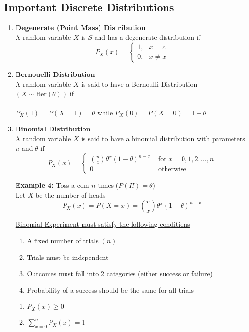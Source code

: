 \documentclass[12pt, twoside]{article}
\begin{document}
\subsection{Important Discrete Distributions}
\begin{enumerate}
	\item{
	\textbf{Degenerate (Point Mass) Distribution}\\
	A random variable $X$ is $S$ and has a degenerate distribution if
	$$P_X (x) = 
	\begin{cases}
	1, & x=c\\
	0, & x\neq x
\end{cases}$$
	}
	\item{
	\textbf{Bernouelli Distribution}\\
	A random variable $X$ is said to have a Bernoulli Distribution $(X \sim \text{Ber}(\theta))$ if\\
	\\
	$P_X (1) = P(X = 1) = \theta$ while $P_X (0) = P(X = 0) = 1-\theta$
	}
	\item{
	\textbf{Binomial Distribution}\\
	A random variable $X$ is said to have a binomial distribution with parameters $n$ and $\theta$ if
	$$P_X (x) =
	\begin{cases} 
		\binom{n}{x} \theta^x (1-\theta)^{n-x} & \text{ for } x = 0,1,2,...,n\\
		0 & \text{ otherwise }
	\end{cases}$$
	
	\textbf{Example 4:} Toss a coin $n$ times ($P(H) = \theta$)\\
Let $X$ be the number of heads\\
$$P_X (x) = P(X = x) = \binom{n}{x} \theta^x (1-\theta)^{n-x}$$

\underline{Binomial Experiment must satisfy the following conditions}
\begin{enumerate}
	\item{A fixed number of trials $(n)$}
	\item{Trials must be independent}
	\item{Outcomes must fall into 2 categories (either success or failure)}
	\item{Probability of a success should be the same for all trials}
\end{enumerate}

\begin{tcolorbox}[title=Note]
	\begin{enumerate}
		\item{$P_X (x) \geq 0$}
		\item{$\sum_{x=0}^n P_X (x) = 1$}
	\end{enumerate}
\end{tcolorbox}

}
\end{enumerate}
\end{document}
